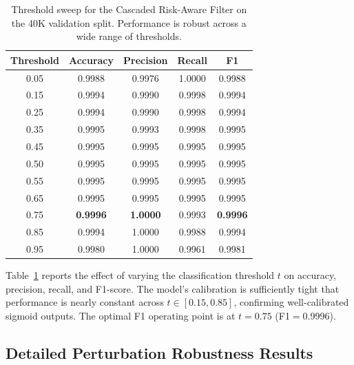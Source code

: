 \documentclass{bmvc2k}
\begin{document}
\begin{table}[H]
\centering
\footnotesize
\vspace{2mm}
\begin{tabular}{@{}c c c c c@{}}
\hline
\textbf{Threshold} & \textbf{Accuracy} & \textbf{Precision} & \textbf{Recall} & \textbf{F1} \\
\hline
0.05 & 0.9988 & 0.9976 & 1.0000 & 0.9988 \\
0.15 & 0.9994 & 0.9990 & 0.9998 & 0.9994 \\
0.25 & 0.9994 & 0.9990 & 0.9998 & 0.9994 \\
0.35 & 0.9995 & 0.9993 & 0.9998 & 0.9995 \\
0.45 & 0.9995 & 0.9995 & 0.9995 & 0.9995 \\
0.50 & 0.9995 & 0.9995 & 0.9995 & 0.9995 \\
0.55 & 0.9995 & 0.9995 & 0.9995 & 0.9995 \\
0.65 & 0.9995 & 0.9995 & 0.9995 & 0.9995 \\
0.75 & \textbf{0.9996} & \textbf{1.0000} & 0.9993 & \textbf{0.9996} \\
0.85 & 0.9994 & 1.0000 & 0.9988 & 0.9994 \\
0.95 & 0.9980 & 1.0000 & 0.9961 & 0.9981 \\
\hline
\end{tabular}
\vspace{3mm}
\caption{Threshold sweep for the Cascaded Risk-Aware Filter on the 40K validation split. Performance is robust across a wide range of thresholds.}
\label{tab:supp-threshold}
\end{table}


Table~\ref{tab:supp-threshold} reports the effect of varying the classification threshold $t$ on accuracy, precision, recall, and F1-score. The model's calibration is sufficiently tight that performance is nearly constant across $t \in [0.15, 0.85]$, confirming well-calibrated sigmoid outputs. The optimal F1 operating point is at $t{=}0.75$ (F1$=$0.9996).

\subsection{Detailed Perturbation Robustness Results}
\label{sec:supp-perturbation}
\end{document}
